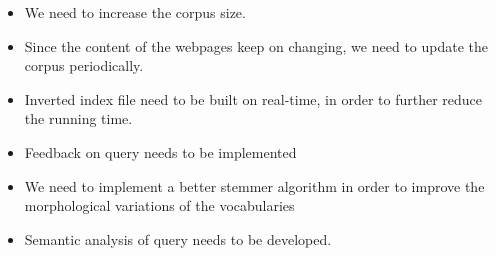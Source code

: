 \label{sec:future_word}

\begin{itemize}
 \item We need to increase the corpus size.
 \item Since the content of the webpages keep on changing, we need to update the corpus periodically.
 \item Inverted index file need to be built on real-time, in order to further reduce the running time.
 \item Feedback on query needs to be implemented
 \item We need to implement a better stemmer algorithm in order to improve the morphological variations of the vocabularies
 \item Semantic analysis of query needs to be developed.
\end{itemize}